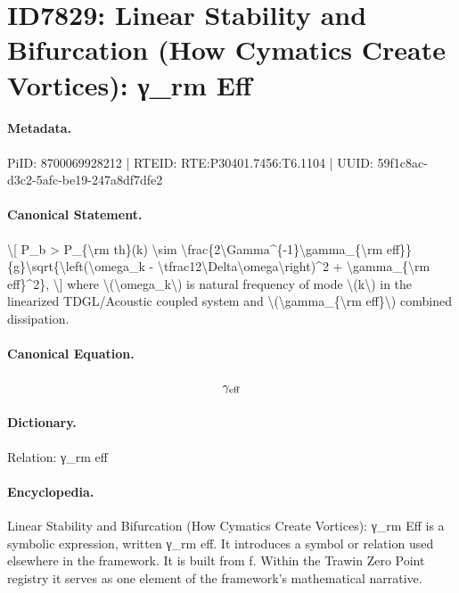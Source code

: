\section*{ID7829: Linear Stability and Bifurcation (How Cymatics Create Vortices): γ\_rm Eff}
\paragraph{Metadata.}
PiID: 8700069928212 | RTEID: RTE:P30401.7456:T6.1104 | UUID: 59f1c8ac-d3c2-5afc-be19-247a8df7dfe2

\paragraph{Canonical Statement.}
\textbackslash{}[ P\_b > P\_\{\textbackslash{}rm th\}(k) \textbackslash{}sim \textbackslash{}frac\{2\textbackslash{}Gamma\textasciicircum{}\{-1\}\textbackslash{}gamma\_\{\textbackslash{}rm eff\}\}\{g\}\textbackslash{}sqrt\{\textbackslash{}left(\textbackslash{}omega\_k - \textbackslash{}tfrac12\textbackslash{}Delta\textbackslash{}omega\textbackslash{}right)\textasciicircum{}2 + \textbackslash{}gamma\_\{\textbackslash{}rm eff\}\textasciicircum{}2\}, \textbackslash{}] where \textbackslash{}(\textbackslash{}omega\_k\textbackslash{}) is natural frequency of mode \textbackslash{}(k\textbackslash{}) in the linearized TDGL/Acoustic coupled system and \textbackslash{}(\textbackslash{}gamma\_\{\textbackslash{}rm eff\}\textbackslash{}) combined dissipation.

\paragraph{Canonical Equation.}
\[
\gamma_{\rm eff}
\]

\paragraph{Dictionary.}
Relation: γ\_rm eff

\paragraph{Encyclopedia.}
Linear Stability and Bifurcation (How Cymatics Create Vortices): γ\_rm Eff is a symbolic expression, written γ\_rm eff. It introduces a symbol or relation used elsewhere in the framework. It is built from f. Within the Trawin Zero Point registry it serves as one element of the framework's mathematical narrative.
